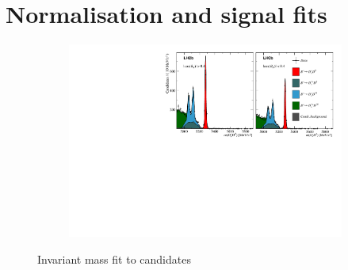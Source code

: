 \section{Normalisation and signal fits}
\begin{figure}[!h]
    \centering
    \begin{subfigure}[t]{0.85\textwidth}
        \includegraphics[width=1.0\textwidth]{figs/B2DsPhi/B2DsD0_result.pdf}
    \end{subfigure}
    \caption{Invariant mass fit to \decay{\Bp}{\Dsp\Dzb} candidates}
    \label{fig:B2DsPhi_Norm_Fit}
\end{figure}
